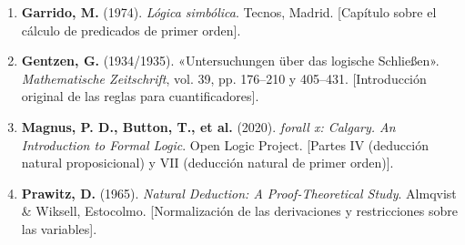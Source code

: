 \begin{enumerate}
    \item \textbf{Garrido, M.} (1974). \emph{Lógica simbólica}. Tecnos, Madrid. [Capítulo sobre el cálculo de predicados de primer orden].
    \item \textbf{Gentzen, G.} (1934/1935). «Untersuchungen über das logische Schließen». \emph{Mathematische Zeitschrift}, vol. 39, pp. 176--210 y 405--431. [Introducción original de las reglas para cuantificadores].
    \item \textbf{Magnus, P. D., Button, T., et al.} (2020). \emph{forall x: Calgary. An Introduction to Formal Logic}. Open Logic Project. [Partes IV (deducción natural proposicional) y VII (deducción natural de primer orden)].
    \item \textbf{Prawitz, D.} (1965). \emph{Natural Deduction: A Proof-Theoretical Study}. Almqvist \& Wiksell, Estocolmo. [Normalización de las derivaciones y restricciones sobre las variables].
\end{enumerate}

